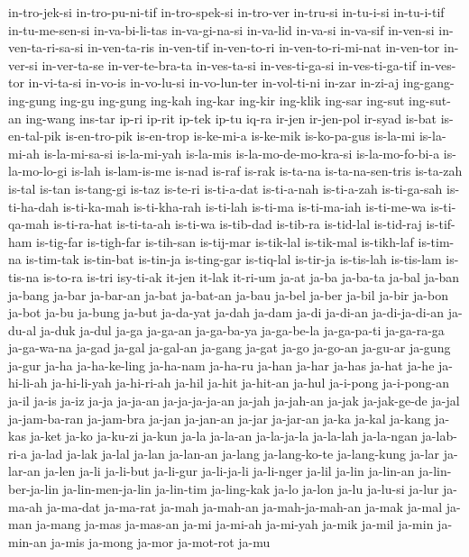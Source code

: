 {in-tro-jek-si in-tro-pu-ni-tif in-tro-spek-si in-tro-ver in-tru-si
in-tu-i-si in-tu-i-tif in-tu-me-sen-si in-va-bi-li-tas in-va-gi-na-si
in-va-lid in-va-si in-va-sif in-ven-si in-ven-ta-ri-sa-si in-ven-ta-ris
in-ven-tif in-ven-to-ri in-ven-to-ri-mi-nat in-ven-tor in-ver-si
in-ver-ta-se in-ver-te-bra-ta in-ves-ta-si in-ves-ti-ga-si
in-ves-ti-ga-tif in-ves-tor in-vi-ta-si in-vo-is in-vo-lu-si in-vo-lun-ter
in-vol-ti-ni in-zar in-zi-aj ing-gang-ing-gung ing-gu ing-gung ing-kah
ing-kar ing-kir ing-klik ing-sar ing-sut ing-sut-an ing-wang ins-tar ip-ri
ip-rit ip-tek ip-tu iq-ra ir-jen ir-jen-pol ir-syad is-bat is-en-tal-pik
is-en-tro-pik is-en-trop is-ke-mi-a is-ke-mik is-ko-pa-gus is-la-mi
is-la-mi-ah is-la-mi-sa-si is-la-mi-yah is-la-mis is-la-mo-de-mo-kra-si
is-la-mo-fo-bi-a is-la-mo-lo-gi is-lah is-lam-is-me is-nad is-raf is-rak
is-ta-na is-ta-na-sen-tris is-ta-zah is-tal is-tan is-tang-gi is-taz
is-te-ri is-ti-a-dat is-ti-a-nah is-ti-a-zah is-ti-ga-sah is-ti-ha-dah
is-ti-ka-mah is-ti-kha-rah is-ti-lah is-ti-ma is-ti-ma-iah is-ti-me-wa
is-ti-qa-mah is-ti-ra-hat is-ti-ta-ah is-ti-wa is-tib-dad is-tib-ra
is-tid-lal is-tid-raj is-tif-ham is-tig-far is-tigh-far is-tih-san
is-tij-mar is-tik-lal is-tik-mal is-tikh-laf is-tim-na is-tim-tak
is-tin-bat is-tin-ja is-ting-gar is-tiq-lal is-tir-ja is-tis-lah
is-tis-lam is-tis-na is-to-ra is-tri isy-ti-ak it-jen it-lak it-ri-um
ja-at ja-ba ja-ba-ta ja-bal ja-ban ja-bang ja-bar ja-bar-an ja-bat
ja-bat-an ja-bau ja-bel ja-ber ja-bil ja-bir ja-bon ja-bot ja-bu ja-bung
ja-but ja-da-yat ja-dah ja-dam ja-di ja-di-an ja-di-ja-di-an ja-du-al
ja-duk ja-dul ja-ga ja-ga-an ja-ga-ba-ya ja-ga-be-la ja-ga-pa-ti
ja-ga-ra-ga ja-ga-wa-na ja-gad ja-gal ja-gal-an ja-gang ja-gat ja-go
ja-go-an ja-gu-ar ja-gung ja-gur ja-ha ja-ha-ke-ling ja-ha-nam ja-ha-ru
ja-han ja-har ja-has ja-hat ja-he ja-hi-li-ah ja-hi-li-yah ja-hi-ri-ah
ja-hil ja-hit ja-hit-an ja-hul ja-i-pong ja-i-pong-an ja-il ja-is ja-iz
ja-ja ja-ja-an ja-ja-ja-ja-an ja-jah ja-jah-an ja-jak ja-jak-ge-de ja-jal
ja-jam-ba-ran ja-jam-bra ja-jan ja-jan-an ja-jar ja-jar-an ja-ka ja-kal
ja-kang ja-kas ja-ket ja-ko ja-ku-zi ja-kun ja-la ja-la-an ja-la-ja-la
ja-la-lah ja-la-ngan ja-lab-ri-a ja-lad ja-lak ja-lal ja-lan ja-lan-an
ja-lang ja-lang-ko-te ja-lang-kung ja-lar ja-lar-an ja-len ja-li ja-li-but
ja-li-gur ja-li-ja-li ja-li-nger ja-lil ja-lin ja-lin-an ja-lin-ber-ja-lin
ja-lin-men-ja-lin ja-lin-tim ja-ling-kak ja-lo ja-lon ja-lu ja-lu-si
ja-lur ja-ma-ah ja-ma-dat ja-ma-rat ja-mah ja-mah-an ja-mah-ja-mah-an
ja-mak ja-mal ja-man ja-mang ja-mas ja-mas-an ja-mi ja-mi-ah ja-mi-yah
ja-mik ja-mil ja-min ja-min-an ja-mis ja-mong ja-mor ja-mot-rot ja-mu
}
